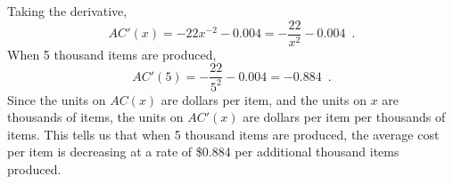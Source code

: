 \begin{example}
\begin{enumerate}[label=(\alph*)]
\begin{solution}
Taking the derivative,
$$ AC'(x)=-22x^{-2}-0.004=-\dfrac{22}{x^2}-0.004 \enspace .$$
When 5 thousand items are produced,
$$ AC'(5)=-\dfrac{22}{5^2}-0.004=-0.884 \enspace .$$
Since the units on $AC(x)$ are dollars per item, and the units on $x$ are thousands of items, the units on $AC'(x)$ are dollars per item per thousands of items. This tells us that when 5 thousand items are produced, the average cost per item is decreasing at a rate of \$0.884 per additional thousand items produced.
    \end{solution}
    \end{enumerate}
\end{example}

